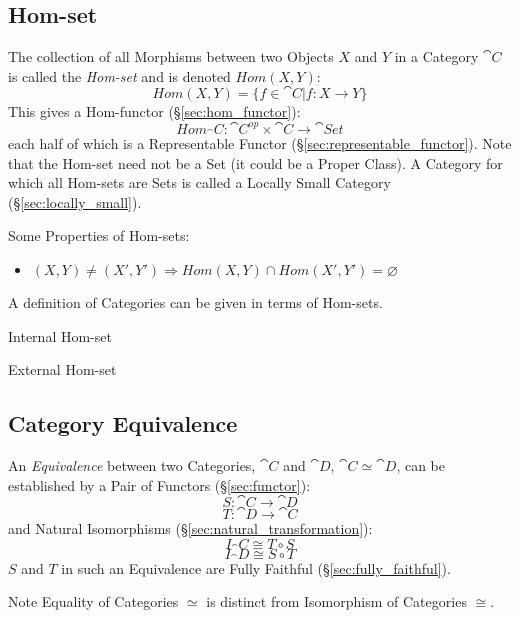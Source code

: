 \subsection{Hom-set}\label{sec:hom_set}

The collection of all Morphisms between two Objects $X$ and $Y$ in a
Category $\cat{C}$ is called the \emph{Hom-set} and is denoted
$Hom(X,Y)$:
\[
  Hom(X,Y) = \{f \in \cat{C} | f : X \rightarrow Y\}
\]
This gives a Hom-functor (\S\ref{sec:hom_functor}):
\[
  Hom_\cat{C} : \cat{C^{op}} \times \cat{C} \rightarrow \cat{Set}
\]
each half of which is a Representable Functor
(\S\ref{sec:representable_functor}).
\newline
\HandRight\; Note that the Hom-set need not be a Set (it could be a
Proper Class). A Category for which all Hom-sets are Sets is called a
Locally Small Category (\S\ref{sec:locally_small}).

Some Properties of Hom-sets:
\begin{itemize}
\item $ (X,Y) \neq (X',Y') \Rightarrow
  Hom(X,Y) \cap Hom(X',Y') = \varnothing$
\end{itemize}

A definition of Categories can be given in terms of Hom-sets. %

Internal Hom-set

External Hom-set



\subsection{Category Equivalence}\label{sec:category_equivalence}

An \emph{Equivalence} between two Categories, $\cat{C}$ and
$\cat{D}$, $\cat{C} \simeq \cat{D}$, can be established by a
Pair of Functors (\S\ref{sec:functor}):
\[
  S : \cat{C} \rightarrow \cat{D}
\]\[
  T : \cat{D} \rightarrow \cat{C}
\]
and Natural Isomorphisms (\S\ref{sec:natural_transformation}):
\[
  I_\cat{C} \cong T \circ S
\]\[
  I_\cat{D} \cong S \circ T
\]
$S$ and $T$ in such an Equivalence are Fully Faithful
(\S\ref{sec:fully_faithful}).

\HandRight\;Note Equality of Categories $\simeq$ is distinct from
Isomorphism of Categories $\cong$.

